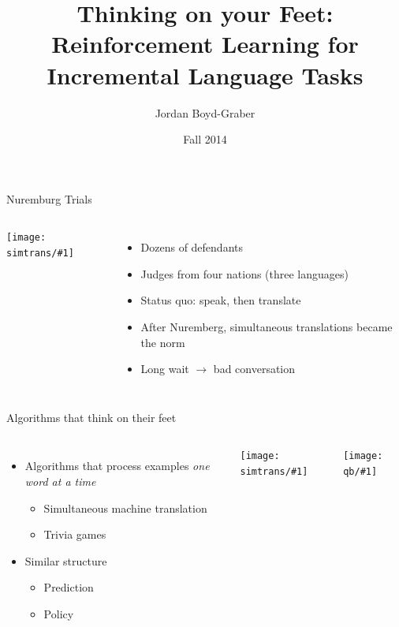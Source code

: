 \documentclass[compress]{beamer}
\title[Thinking on Your Feet]{Thinking on your Feet: Reinforcement Learning for Incremental
Language Tasks}
\author{ Jordan Boyd-Graber}
\date{Fall 2014}
\institute[Boulder] %
{University of Colorado Boulder}
\newcommand{\gfxs}[2]{
\begin{center}
	\texttt{[image: simtrans/\#1]}
\end{center}
}
\newcommand{\gfxq}[2]{
\begin{center}
	\texttt{[image: qb/\#1]}
\end{center}
}
\begin{document}
\frame{
\titlepage
\tiny
}


\begin{frame}{Nuremburg Trials}

\begin{columns}


    \gfxs{nuremberg_trials}{1.0}


    \begin{itemize}
        \item Dozens of defendants
        \item Judges from four nations (three languages)
\pause
        \item Status quo: speak, then translate
\pause
        \item After Nuremberg, simultaneous translations became the
          norm
\pause
        \item Long wait $\rightarrow$ bad conversation
     \end{itemize}

\end{columns}

\end{frame}



\begin{frame}{Algorithms that think on their feet}

\begin{columns}

  \begin{itemize}
     \item Algorithms that process examples \emph{one word at a time}
       \begin{itemize}
         \item Simultaneous machine translation
         \item Trivia games
       \end{itemize}
      \item Similar structure
        \begin{itemize}
          \item Prediction
          \item Policy
        \end{itemize}
  \end{itemize}


  \gfxs{nuremberg_translators}{.7}
  \gfxq{quizbowl}{.7}

\end{columns}

\end{frame}
\end{document}
